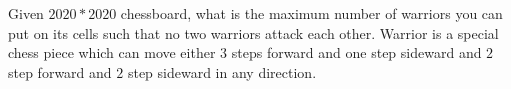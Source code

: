 Given $2020*2020$ chessboard, what is the maximum number of warriors you can put on its cells such that no two warriors attack each other.
Warrior is a special chess piece which can move either $3$ steps  forward and one step sideward and $2$ step forward and $2$ step sideward in any direction.